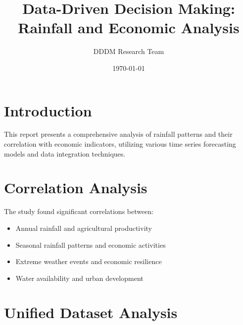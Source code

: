 \documentclass[12pt,a4paper]{article}
\title{Data-Driven Decision Making: Rainfall and Economic Analysis}
\author{DDDM Research Team}
\date{\today}
\begin{document}
\maketitle
\tableofcontents
\newpage

\section{Introduction}
This report presents a comprehensive analysis of rainfall patterns and their correlation with economic indicators, utilizing various time series forecasting models and data integration techniques.

\section{Correlation Analysis}
The study found significant correlations between:
\begin{itemize}
    \item Annual rainfall and agricultural productivity
    \item Seasonal rainfall patterns and economic activities
    \item Extreme weather events and economic resilience
    \item Water availability and urban development
\end{itemize}

\section{Unified Dataset Analysis}
\end{document}

